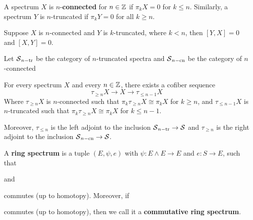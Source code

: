\begin{definition}
    A spectrum $X$ is $n$-\textbf{connected} for $n\in \mathbb{Z}$ if $\pi_kX=0$ for $k\leq n$. Similarly, a spectrum $Y$ is $n$-truncated if $\pi_k Y=0$ for all $k\geq n$.
\end{definition}

\begin{lemma}
    Suppose $X$ is $n$-connected and $Y$ is $k$-truncated, where $k<n$, then $[Y,X]=0$ and $[X,Y]=0$.
\end{lemma}

Let $\operatorname{\mathcal{S}}_{n-\mathrm{tr}}$ be the category of $n$-truncated spectra and $\operatorname{\mathcal{S}}_{n-\mathrm{cn}}$ be the category of $n$-connected
\begin{lemma}
    For every spectrum $X$ and every $n\in \mathbb{Z}$, there exists a cofiber sequence 
    \[
    \tau_{\geq n} X\to X\to \tau_{\leq n-1}X
    \]
    Where $\tau_{\geq n}X$ is $n$-connected such that $\pi_k \tau_{\geq n}X\cong \pi_kX$ for $k\geq n$, and $\tau_{\leq n-1}X$ is $n$-truncated such that $\pi_k \tau_{\geq n}X\cong \pi_kX$ for $k\leq n-1$. 
    
    Moreover, $\tau_{\leq n}$ is the left adjoint to the inclusion $\operatorname{\mathcal{S}}_{n-\mathrm{tr}}\to \operatorname{\mathcal{S}}$ and $\tau_{\geq n}$ is the right adjoint to the inclusion $\operatorname{\mathcal{S}}_{n-\mathrm{cn}}\to \operatorname{\mathcal{S}}$.
\end{lemma}


\begin{definition}
    \cite{PreSwitzer}
 A \textbf{ring spectrum} is a tuple $(E, \psi, e)$ with $\psi: E\wedge E\to E$ and $e: S\to E$, such that
 \begin{center}
\end{center} and 
\begin{center}
\end{center}commutes (up to homotopy). Moreover, if 
\begin{center}
\end{center}commutes (up to homotopy), then we call it a \textbf{commutative ring spectrum}.
\end{definition}

